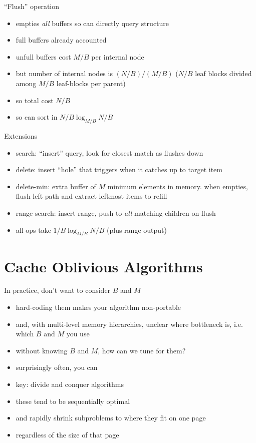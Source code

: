 \documentclass{article}
\begin{document}
``Flush'' operation
\begin{itemize}
\item empties \emph{all} buffers so can directly query structure
\item full buffers already accounted
\item unfull buffers cost $M/B$ per internal node
\item but number of internal nodes is $(N/B)/(M/B)$ ($N/B$ leaf blocks
  divided among $M/B$ leaf-blocks per parent)
\item so total cost $N/B$
\item so can sort in $N/B\log_{M/B} N/B$
\end{itemize}


Extensions
\begin{itemize}
\item search: ``insert'' query, look for closest match as flushes down
\item delete: insert ``hole'' that triggers when it catches up to target item
\item delete-min: extra buffer of $M$ minimum elements in memory.
  when empties, flush left path and extract leftmost items to refill
\item range search: insert range, push to \emph{all} matching children
  on flush
\item all ops take $1/B \log_{M/B}N/B$ (plus range output)
\end{itemize}

\section*{Cache Oblivious Algorithms}

In practice, don't want to consider $B$ and $M$
\begin{itemize}
\item hard-coding them makes your algorithm non-portable
\item and, with multi-level memory hierarchies, unclear where bottleneck is,
  i.e. which $B$ and $M$ you use
\item without knowing $B$ and $M$, how can we tune for them?
\item surprisingly often, you can
\item key: divide and conquer algorithms
\item these tend to be sequentially optimal
\item and rapidly shrink subproblems to where they fit on one page
\item regardless of the size of that page
\end{itemize}
\end{document}
